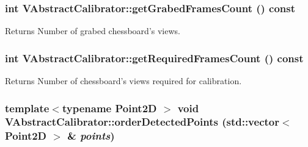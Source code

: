 \hypertarget{classVAbstractCalibrator_a76dce19c461a257a803299d7f87d5e5a}{
\subsubsection[{getGrabedFramesCount}]{\setlength{\rightskip}{0pt plus 5cm}int VAbstractCalibrator::getGrabedFramesCount () const}}
\label{classVAbstractCalibrator_a76dce19c461a257a803299d7f87d5e5a}
\begin{DoxyReturn}{Returns}
Number of grabed chessboard's views. 
\end{DoxyReturn}
\hypertarget{classVAbstractCalibrator_a35e8e4978841f1fe517b25eee89f491e}{
\subsubsection[{getRequiredFramesCount}]{\setlength{\rightskip}{0pt plus 5cm}int VAbstractCalibrator::getRequiredFramesCount () const}}
\label{classVAbstractCalibrator_a35e8e4978841f1fe517b25eee89f491e}
\begin{DoxyReturn}{Returns}
Number of chessboard's views required for calibration. 
\end{DoxyReturn}
\hypertarget{classVAbstractCalibrator_aa1ce901379c3c1464887a3ef89059e60}{
\subsubsection[{orderDetectedPoints}]{\setlength{\rightskip}{0pt plus 5cm}template$<$typename Point2D $>$ void VAbstractCalibrator::orderDetectedPoints (std::vector$<$ Point2D $>$ \& {\em points})}}
\label{classVAbstractCalibrator_aa1ce901379c3c1464887a3ef89059e60}


